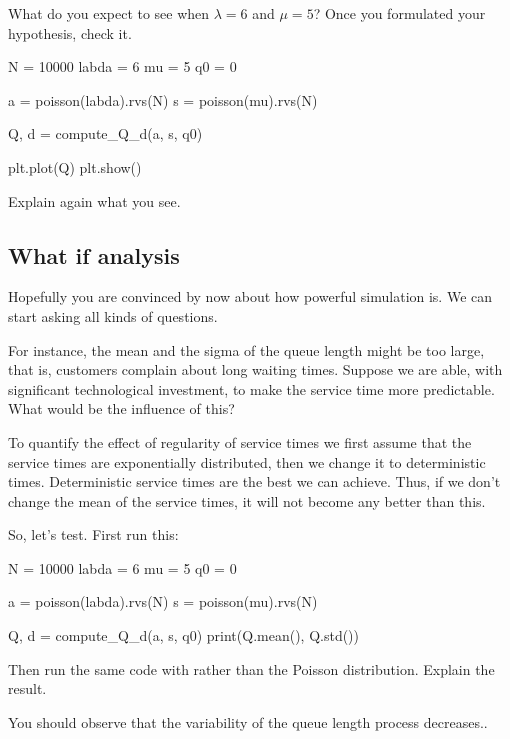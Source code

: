 \documentclass{scrartcl}
\begin{document}
\begin{exercise}
What do you expect to see when $\lambda=6$ and $\mu=5$? Once you formulated your hypothesis, check it.

\begin{pyverbatim}
N = 10000
labda = 6
mu = 5
q0 = 0

a = poisson(labda).rvs(N)
s = poisson(mu).rvs(N)

Q, d = compute_Q_d(a, s, q0)

plt.plot(Q)
plt.show()
  \end{pyverbatim}
Explain again what you see.
\end{exercise}

\subsection{What if analysis}
\label{sec:what-if-analysis}

Hopefully you  are  convinced by now about how powerful simulation is.  We can start asking all kinds of questions.

\begin{exercise}
  For instance,  the mean and the sigma of the queue length might be too large, that is, customers complain about long waiting times.  Suppose we are able, with significant technological investment, to make the service time more predictable. What would be the influence of this?

To quantify the effect of regularity of service times we first assume that the service times are exponentially distributed, then we change it to deterministic times.
 Deterministic service times are the best we can achieve. Thus, if we don't change the mean of the service times, it will not become any better than this.


So, let's test. First run this:
\begin{pyverbatim}
N = 10000
labda = 6
mu = 5
q0 = 0

a = poisson(labda).rvs(N)
s = poisson(mu).rvs(N)

Q, d = compute_Q_d(a, s, q0)
print(Q.mean(), Q.std())
\end{pyverbatim}
Then run the same code with  rather than the Poisson distribution. Explain the result.
\begin{solution}
	You should observe that the variability of the queue length process decreases..
\end{solution}
\end{exercise}
\end{document}

